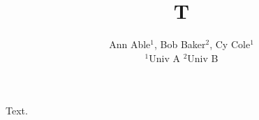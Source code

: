 \documentclass{article}
\begin{document}
\title{T}
\author{Ann Able$^1$, Bob Baker$^2$, Cy Cole$^{1}$ \\
$^1$Univ A $^2$Univ B}
\maketitle
Text.
\end{document}
